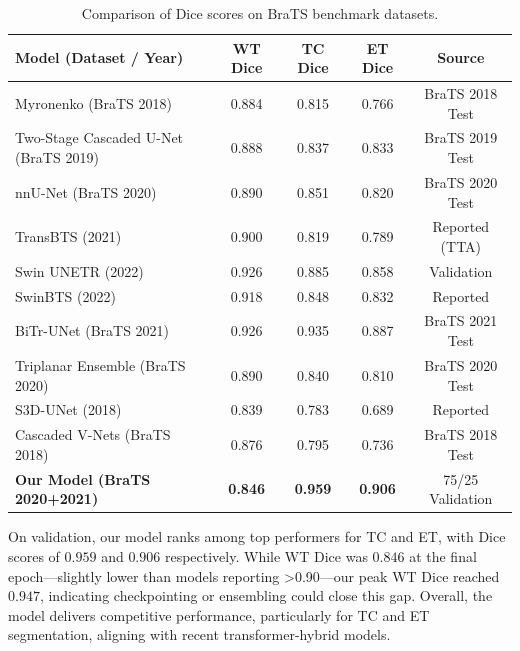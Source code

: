\documentclass[a4paper,fleqn]{cas-dc}
\begin{document}
\begin{table}[!htbp]
    \caption{Comparison of Dice scores on BraTS benchmark datasets.}
    \label{tab:brats_comparison}
    \centering
    \begin{tabular}{lcccc}
        \toprule
        Model (Dataset / Year) & WT Dice & TC Dice & ET Dice & Source \\
        \midrule
        Myronenko (BraTS 2018)\cite{myronenko20183dmribraintumor}                    & 0.884 & 0.815 & 0.766 & BraTS 2018 Test \\
        Two-Stage Cascaded U-Net (BraTS 2019)\cite{Two-Stage_Cascaded_U-Net}      & 0.888 & 0.837 & 0.833 & BraTS 2019 Test \\
        nnU-Net (BraTS 2020)\cite{isensee2020nnunetbraintumorsegmentation}                    & 0.890 & 0.851 & 0.820 & BraTS 2020 Test \\
        TransBTS (2021)\cite{wang2021transbts}                            & 0.900 & 0.819 & 0.789 & Reported (TTA)  \\
        Swin UNETR (2022)                          & 0.926 & 0.885 & 0.858 & Validation      \\
        SwinBTS (2022)                             & 0.918 & 0.848 & 0.832 & Reported        \\
        BiTr-UNet (BraTS 2021)                     & 0.926 & 0.935 & 0.887 & BraTS 2021 Test \\
        Triplanar Ensemble (BraTS 2020)            & 0.890 & 0.840 & 0.810 & BraTS 2020 Test \\
        S3D-UNet (2018)                            & 0.839 & 0.783 & 0.689 & Reported        \\
        Cascaded V-Nets (BraTS 2018)               & 0.876 & 0.795 & 0.736 & BraTS 2018 Test \\
        \textbf{Our Model (BraTS 2020+2021)}       & \textbf{0.846} & \textbf{0.959} & \textbf{0.906} & 75/25 Validation \\
        \bottomrule
    \end{tabular}
\end{table}

On validation, our model ranks among top performers for TC and ET, with Dice scores of $0.959$ and $0.906$ respectively. While WT Dice was $0.846$ at the final epoch—slightly lower than models reporting >0.90—our peak WT Dice reached $0.947$, indicating checkpointing or ensembling could close this gap. Overall, the model delivers competitive performance, particularly for TC and ET segmentation, aligning with recent transformer-hybrid models.
\end{document}
